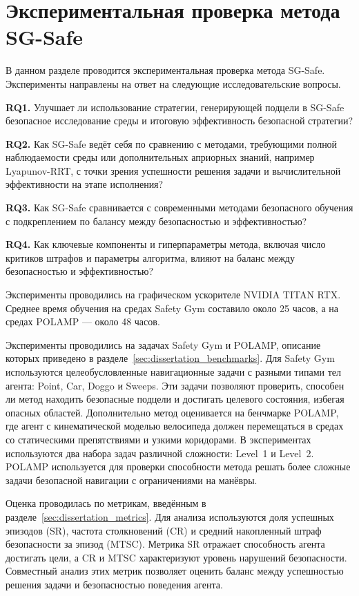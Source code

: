 \section{Экспериментальная проверка метода SG-Safe}
\label{sec:sgsafe_experiments}

В данном разделе проводится экспериментальная проверка метода SG-Safe. Эксперименты направлены на ответ на следующие исследовательские вопросы.

\textbf{RQ1.} Улучшает ли использование стратегии, генерирующей подцели в SG-Safe безопасное исследование среды и итоговую эффективность безопасной стратегии?

\textbf{RQ2.} Как SG-Safe ведёт себя по сравнению с методами, требующими полной наблюдаемости среды или дополнительных априорных знаний, например Lyapunov-RRT, с точки зрения успешности решения задачи и вычислительной эффективности на этапе исполнения?

\textbf{RQ3.} Как SG-Safe сравнивается с современными методами безопасного обучения с подкреплением по балансу между безопасностью и эффективностью?

\textbf{RQ4.} Как ключевые компоненты и гиперпараметры метода, включая число критиков штрафов и параметры алгоритма, влияют на баланс между безопасностью и эффективностью?

Эксперименты проводились на графическом ускорителе NVIDIA TITAN RTX. Среднее время обучения на средах Safety Gym составило около 25 часов, а на средах POLAMP --- около 48 часов.

Эксперименты проводились на задачах Safety Gym и POLAMP, описание которых приведено в разделе~\ref{sec:dissertation_benchmarks}. Для Safety Gym используются целеобусловленные навигационные задачи с разными типами тел агента: Point, Car, Doggo и Sweeps. Эти задачи позволяют проверить, способен ли метод находить безопасные подцели и достигать целевого состояния, избегая опасных областей. Дополнительно метод оценивается на бенчмарке POLAMP, где агент с кинематической моделью велосипеда должен перемещаться в средах со статическими препятствиями и узкими коридорами. В экспериментах используются два набора задач различной сложности: Level~1 и Level~2. POLAMP используется для проверки способности метода решать более сложные задачи безопасной навигации с ограничениями на манёвры.

Оценка проводилась по метрикам, введённым в разделе~\ref{sec:dissertation_metrics}. Для анализа используются доля успешных эпизодов (SR), частота столкновений (CR) и средний накопленный штраф безопасности за эпизод (MTSC). Метрика SR отражает способность агента достигать цели, а CR и MTSC характеризуют уровень нарушений безопасности. Совместный анализ этих метрик позволяет оценить баланс между успешностью решения задачи и безопасностью поведения агента.

